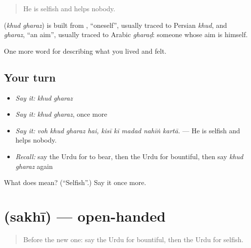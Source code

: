 \begin{quote}
He is selfish and helps nobody.
\end{quote}

\begin{cousinweb}
\textbf{ } (\emph{khud gharaz}) is built from \textbf{}, \textquotedblleft{}oneself\textquotedblright{}, usually traced to Persian \emph{khud}, and \emph{gharaz}, \textquotedblleft{}an aim\textquotedblright{}, usually traced to Arabic \emph{gharaḍ}: someone whose aim is himself.
\end{cousinweb}

\begin{grammarlens}[title={What you've built}]
One more word for describing what you lived and felt.
\end{grammarlens}

\subsection*{Your turn}
\begin{itemize}
\raggedright
  \item \emph{Say it:} \emph{khud gharaz}
  \item \emph{Say it:} \emph{khud gharaz}, once more
  \item \emph{Say it:} \emph{voh khud gharaz hai, kisī kī madad nahīṅ kartā.} — He is selfish and helps nobody.
  \item \emph{Recall:} say the Urdu for to bear, then the Urdu for bountiful, then say \emph{khud gharaz} again
\end{itemize}

\begin{tcolorbox}[breakable,colback=teal!4,colframe=teal!35!black,title={Before you move on}]
What does   mean? (\textquotedblleft{}Selfish\textquotedblright{}.) Say it once more.
\end{tcolorbox}
\section[\texorpdfstring{\ur{سخی} (sakhī)}{سخی (sakhī)}]{ (sakhī) — open-handed}

\label{lesson:UR-C459-sakhi}



\begin{quote}
Before the new one: say the Urdu for bountiful, then the Urdu for selfish.
\end{quote}

